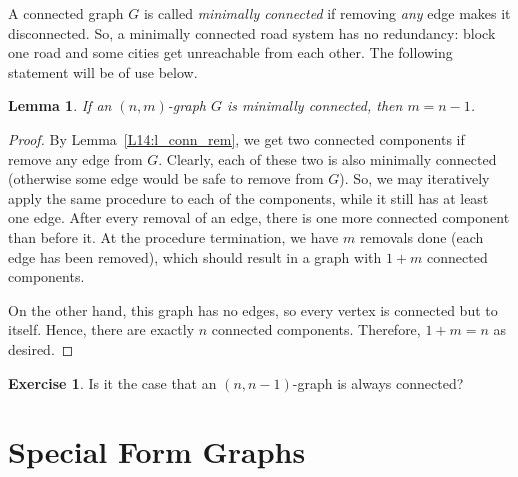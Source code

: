 \documentclass[12pt,notitlepage]{article}
\theoremstyle{plain}
\newtheorem{lemma}[thm]{Lemma}
\theoremstyle{definition}
\newtheorem{exc}[thm]{Exercise}
\theoremstyle{plain}
\newcommand{\1}{\mathbf{1}}
\newcommand{\0}{\mathbf{0}}
\begin{document}
A connected graph $G$ is called \emph{minimally connected} if removing \emph{any} edge makes it disconnected. So, a minimally connected road system has no redundancy: block one road and some cities get unreachable from each other. The following statement will be of use below.

\begin{lemma}\label{L14:l_min_conn_edge}
If an $(n,m)$-graph $G$ is minimally connected, then $m = n - 1$.
\end{lemma}
\begin{proof}
By Lemma~\ref{L14:l_conn_rem}, we get two connected components if remove any edge from $G$. Clearly, each of these two is also minimally connected (otherwise some edge would be safe to remove from $G$). So, we may iteratively apply the same procedure to each of the components, while it still has at least one edge. After every removal of an edge, there is one more connected component than before it. At the procedure termination, we have $m$ removals done (each edge has been removed), which should result in a graph with $1 + m$ connected components.

On the other hand, this graph has no edges, so every vertex is connected but to itself. Hence, there are exactly $n$ connected components. Therefore, $1 + m = n$ as desired.
\end{proof}

\begin{exc}
Is it the case that an $(n, n - 1)$-graph is always connected?
\end{exc}

\section{Special Form Graphs}
\end{document}
